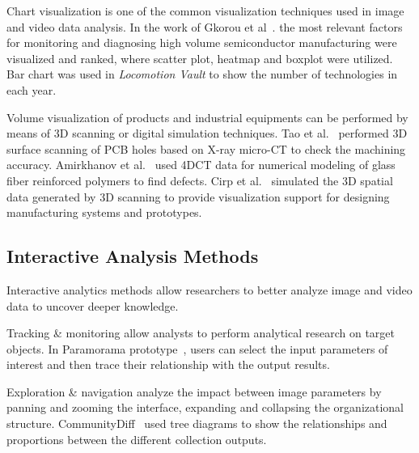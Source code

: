 \documentclass[a4paper,fleqn]{cas-dc}
\begin{document}
Chart visualization is one of the common visualization techniques used in image and video data analysis. In the work of Gkorou et al~\cite{Gkorou2017}. the most relevant factors for monitoring and diagnosing high volume semiconductor manufacturing were visualized and ranked, where scatter plot, heatmap and boxplot were utilized.
Bar chart was used in \textit{Locomotion Vault} to show the number of technologies in each year.

Volume visualization of products and industrial equipments can be performed by means of 3D scanning or digital simulation techniques.
Tao et al.~\cite{tao2020machining} performed 3D surface scanning of PCB holes based on X-ray micro-CT to check the machining accuracy.
Amirkhanov et al.~\cite{tao2020machining} used 4DCT data for numerical modeling of glass fiber reinforced polymers to find defects.
Cirp et al.~\cite{Cirp2019} simulated the 3D spatial data generated by 3D scanning to provide visualization support for designing manufacturing systems and prototypes.

\subsection{Interactive Analysis Methods}
Interactive analytics methods allow researchers to better analyze image and video data to uncover deeper knowledge. 

Tracking \& monitoring allow analysts to perform analytical research on target objects. 
In Paramorama prototype~\cite{Pretorius2011}, users can select the input parameters of interest and then trace their relationship with the output results.

Exploration \& navigation analyze the impact between image parameters by panning and zooming the interface, expanding and collapsing the organizational structure.
CommunityDiff~\cite{Datta2018} used tree diagrams to show the relationships and proportions between the different collection outputs.
\end{document}
